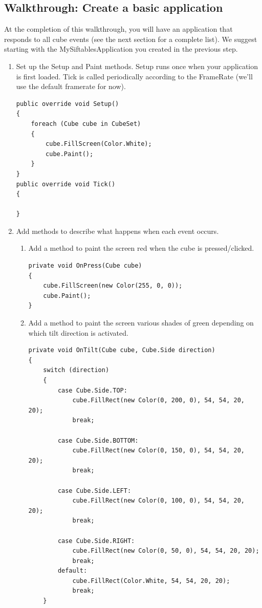 \documentclass[12pt]{article}
\begin{document}
\subsection{Walkthrough: Create a basic application}
At the completion of this walkthrough, you will have an application that responds to all cube events (see the next section for a complete list). We suggest starting with the MySiftablesApplication you created in the previous step.
\begin{enumerate}
\item Set up the Setup and Paint methods. Setup runs once when your application is first loaded. Tick is called periodically according to the FrameRate (we'll use the default framerate for now).
\begin{verbatim}
public override void Setup()
{
    foreach (Cube cube in CubeSet)
    {
        cube.FillScreen(Color.White);
        cube.Paint();
    }
}
public override void Tick()
{

}
\end{verbatim}
\item Add methods to describe what happens when each event occurs.
\begin{enumerate}
\item Add a method to paint the screen red when the cube is pressed/clicked.
\begin{verbatim}
private void OnPress(Cube cube)
{
    cube.FillScreen(new Color(255, 0, 0));
    cube.Paint();
}
\end{verbatim}
\item Add a method to paint the screen various shades of green depending on which tilt direction is activated.
\begin{verbatim}
private void OnTilt(Cube cube, Cube.Side direction)
{
    switch (direction)
    {
        case Cube.Side.TOP:
            cube.FillRect(new Color(0, 200, 0), 54, 54, 20, 20);
            break;

        case Cube.Side.BOTTOM:
            cube.FillRect(new Color(0, 150, 0), 54, 54, 20, 20);
            break;

        case Cube.Side.LEFT:
            cube.FillRect(new Color(0, 100, 0), 54, 54, 20, 20);
            break;

        case Cube.Side.RIGHT:
            cube.FillRect(new Color(0, 50, 0), 54, 54, 20, 20);
            break;
        default:
            cube.FillRect(Color.White, 54, 54, 20, 20);
            break;
    }


\end{verbatim}
\end{enumerate}
\end{enumerate}
\end{document}
